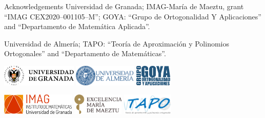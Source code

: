 \documentclass[compress,aspectratio=169]{beamer}
\begin{document}
  \begin{frame}{Acknowledgements}
	Universidad de Granada; IMAG-María de Maeztu, grant ``IMAG CEX2020--001105--M''; GOYA: ``Grupo de Ortogonalidad Y Aplicaciones'' and ``Departamento de Matemática Aplicada''.

\noindent Universidad de Almería; TAPO: ``Teoría de Aproximación y Polinomios Ortogonales'' and ``Departamento de Matemáticas''.
		\bigskip
		\vspace{0.5pt}
		\centerline{
		\includegraphics[height=1cm]{Images/ugrH} \quad
		\includegraphics[height=1cm]{Images/ual.png} \quad
		\includegraphics[height=1cm]{Images/goya.png}
		}
		\vspace{0.5cm}
		\centerline{
		\includegraphics[height=1cm]{Images/IMAG} \quad
		\includegraphics[height=1cm]{Images/maeztu} \quad
		\includegraphics[height=1cm]{Images/tapo.png}
		}
  \end{frame}
\end{document}
